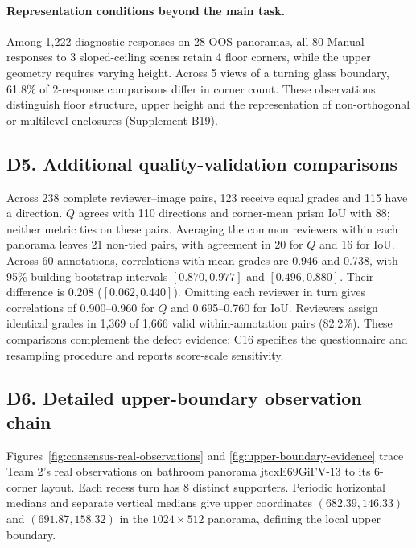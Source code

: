 \documentclass[10pt,a4paper]{article}
\begin{document}

\paragraph{Representation conditions beyond the main task.}
Among 1,222 diagnostic responses on 28 OOS panoramas, all 80 Manual responses to 3 sloped-ceiling scenes retain 4 floor corners, while the upper geometry requires varying height. Across 5 views of a turning glass boundary, 61.8\% of 2-response comparisons differ in corner count. These observations distinguish floor structure, upper height and the representation of non-orthogonal or multilevel enclosures (Supplement B19).

\subsection*{D5. Additional quality-validation comparisons}
\label{supp:d5-validation}

Across 238 complete reviewer--image pairs, 123 receive equal grades and 115 have a direction. $Q$ agrees with 110 directions and corner-mean prism IoU with 88; neither metric ties on these pairs. Averaging the common reviewers within each panorama leaves 21 non-tied pairs, with agreement in 20 for $Q$ and 16 for IoU. Across 60 annotations, correlations with mean grades are 0.946 and 0.738, with 95\% building-bootstrap intervals $[0.870,0.977]$ and $[0.496,0.880]$. Their difference is 0.208 ($[0.062,0.440]$). Omitting each reviewer in turn gives correlations of 0.900--0.960 for $Q$ and 0.695--0.760 for IoU. Reviewers assign identical grades in 1,369 of 1,666 valid within-annotation pairs (82.2\%). These comparisons complement the defect evidence; C16 specifies the questionnaire and resampling procedure and reports score-scale sensitivity.

\subsection*{D6. Detailed upper-boundary observation chain}
\label{supp:d6-upper}

Figures~\ref{fig:consensus-real-observations} and \ref{fig:upper-boundary-evidence} trace Team 2's real observations on bathroom panorama jtcxE69GiFV-13 to its 6-corner layout. Each recess turn has 8 distinct supporters. Periodic horizontal medians and separate vertical medians give upper coordinates $(682.39,146.33)$ and $(691.87,158.32)$ in the $1024\times512$ panorama, defining the local upper boundary.



\FloatBarrier


\end{document}

